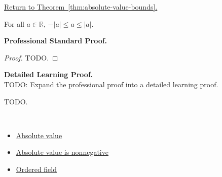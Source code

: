 \newpage
{}
\label{prf:absolute-value-bounds}

\begin{remark*}[Return]
\hyperref[thm:absolute-value-bounds]{Return to Theorem~\ref*{thm:absolute-value-bounds}.}
\end{remark*}

\begin{theorem*}
For all $a \in \mathbb{R}$,
$-\lvert a \rvert \le a \le \lvert a \rvert$.
\end{theorem*}

\textbf{Professional Standard Proof.}~\\
\begin{proof}
TODO.
\end{proof}

\textbf{Detailed Learning Proof.}~\\
TODO: Expand the professional proof into a detailed learning proof.


\begin{remark*}
TODO.
\end{remark*}

\begin{remark*}[Dependencies]~\\
\begin{itemize}
  \item \hyperref[def:absolute-value]{Absolute value}
  \item \hyperref[thm:absolute-value-nonneg]{Absolute value is nonnegative}
  \item \hyperref[def:ordered-field]{Ordered field}
\end{itemize}
\end{remark*}

